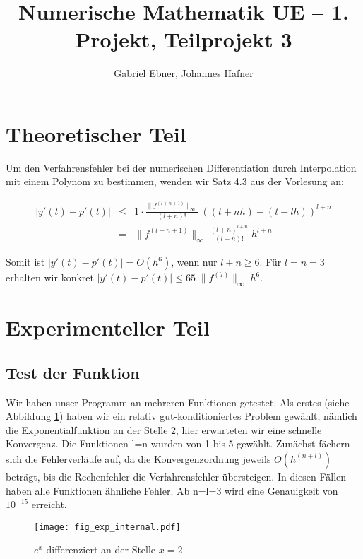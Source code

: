 \documentclass{scrartcl}
\begin{document}
\title{Numerische Mathematik UE -- 1. Projekt, Teilprojekt 3}
\author{Gabriel Ebner, Johannes Hafner}
\maketitle

\section{Theoretischer Teil}

Um den Verfahrensfehler bei der numerischen Differentiation durch Interpolation
mit einem Polynom zu bestimmen, wenden wir Satz 4.3 aus der Vorlesung an:

\begin{eqnarray*}
|y'(t) - p'(t)| &\leq& 1 \cdot
    \frac{\|f^{(l+n+1)}\|_\infty}{(l+n)!}\; ((t+nh) - (t-lh))^{l+n} \\
  &=& \|f^{(l+n+1)}\|_\infty\; \frac{(l+n)^{l+n}}{(l+n)!}\; h^{l+n}
\end{eqnarray*}

Somit ist \(|y'(t)-p'(t)| = O(h^6)\), wenn nur \(l+n \geq 6\).  Für \(l=n=3\)
erhalten wir konkret \(|y'(t)-p'(t)| \leq 65\; \|f^{(7)}\|_\infty\; h^6\).

\section{Experimenteller Teil}
\subsection{Test der Funktion}

Wir haben unser Programm an mehreren Funktionen getestet.  Als erstes (siehe
Abbildung \ref{fig:exp}) haben wir ein relativ gut-konditioniertes Problem
gewählt, nämlich die Exponentialfunktion an der Stelle \(2\), hier erwarteten
wir eine schnelle Konvergenz.
Die Funktionen l=n wurden von 1 bis 5 gewählt.
Zunächst fächern sich die Fehlerverläufe auf, da die Konvergenzordnung jeweils \(O(h^{(n+l)})\) beträgt, bis die Rechenfehler die Verfahrensfehler übersteigen. In diesen Fällen haben alle Funktionen ähnliche Fehler.
Ab n=l=3 wird eine Genauigkeit von \(10^{-15}\) erreicht.

\begin{figure}[!htb]
\centering
\texttt{[image: fig\_exp\_internal.pdf]}
\caption{\(e^x\) differenziert an der Stelle \(x=2\)}
\label{fig:exp}
\end{figure}
\end{document}
